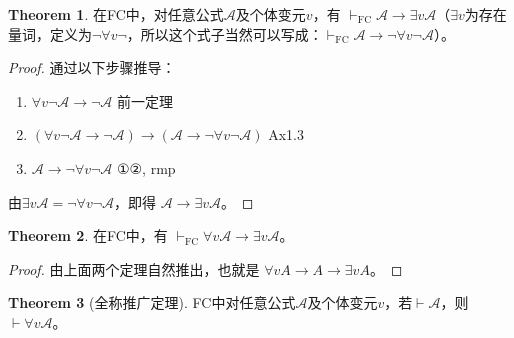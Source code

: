 \documentclass[oneside]{book}
\theoremstyle{definition}
\newtheorem{theorem}{Theorem}[section]
\begin{document}
\begin{theorem}
	在FC中，对任意公式\( \mathcal{A} \)及个体变元\( v \)，有 \( \vdash_{\text{FC}} \mathcal{A} \to \exists v \mathcal{A} \)（\( \exists v \)为存在量词，定义为\( \neg \forall v \neg \)，所以这个式子当然可以写成：\( \vdash_{\text{FC}} \mathcal{A} \to \neg \forall v \neg  \mathcal{A} \)）。
\end{theorem}
\begin{proof}
	通过以下步骤推导：
	\begin{enumerate}
		\item \( \forall v \neg \mathcal{A} \to \neg \mathcal{A} \) \hfill 前一定理
		\item \( (\forall v \neg \mathcal{A} \to \neg \mathcal{A}) \to (\mathcal{A} \to \neg \forall v \neg \mathcal{A}) \) \hfill Ax1.3
		\item \( \mathcal{A} \to \neg \forall v \neg \mathcal{A} \) \hfill ①②, rmp
	\end{enumerate}
	由\( \exists v \mathcal{A} = \neg \forall v \neg \mathcal{A} \)，即得 \( \mathcal{A} \to \exists v \mathcal{A} \)。
\end{proof}


\begin{theorem}
	在FC中，有 \( \vdash_{\text{FC}} \forall v \mathcal{A} \to \exists v \mathcal{A} \)。
\end{theorem}
\begin{proof}
	由上面两个定理自然推出，也就是 \(\forall vA\to  A\to \exists vA\)。
\end{proof}


\begin{theorem}[全称推广定理]
	FC中对任意公式\( \mathcal{A} \)及个体变元\( v \)，若\( \vdash \mathcal{A} \)，则\( \vdash \forall v \mathcal{A} \)。
\end{theorem}
\end{document}
